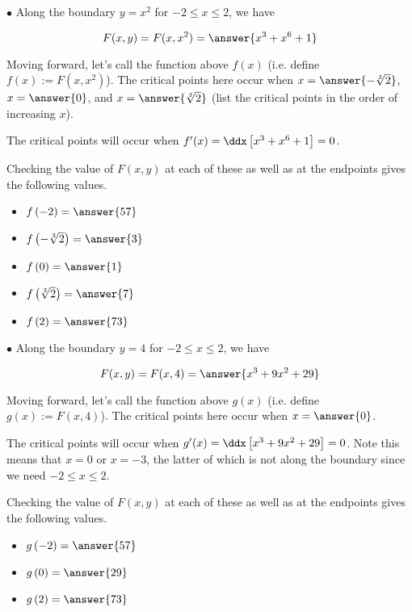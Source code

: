 \documentclass{ximera}
\begin{document}
\begin{exercise}
\begin{exercise}
\begin{exercise}
\begin{exercise}
$\bullet$ Along the boundary $y=x^2$ for $-2 \leq x \leq 2$, we have

\[
F(x,y) = F(x,x^2) = \answer{  x^3 + x^6 +1 }
\]

Moving forward, let's call the function above $f(x)$ (i.e. define $f(x) := F(x,x^2)$).  The critical points here occur when $x=\answer{-\sqrt[3]{2}}$, $x=\answer{0}$, and $x=\answer{\sqrt[3]{2}}$ (list the critical points in the order of increasing $x$).

\begin{hint}
The critical points will occur when $f'(x) = \ddx \left[  x^3 + x^6 +1 \right] =0$.
\end{hint}

\begin{exercise}
Checking the value of $F(x,y)$ at each of these as well as at the endpoints gives the following values.

\begin{itemize}
\item $f\left(-2\right) = \answer{57}$
\item $f\left(-\sqrt[3]{2}\right) = \answer{3}$
\item $f\left(0\right) = \answer{1}$
\item $f\left(\sqrt[3]{2}  \right) = \answer{7}$
\item $f\left(2 \right) = \answer{73}$
\end{itemize}

\end{exercise}

$\bullet$ Along the boundary $y=4$ for $-2 \leq x \leq 2$, we have

\[
F(x,y) = F(x,4) = \answer{  x^3+9x^2 + 29 }
\]

Moving forward,  let's call the function above $g(x)$ (i.e. define $g(x) := F(x,4)$).    The critical points here occur when $x=\answer{0}$.

\begin{hint}
The critical points will occur when $g'(x) = \ddx \left[ x^3+9x^2 + 29 \right] =0$.  Note this means that $x=0$ or $x=-3$, the latter of which is not along the boundary since we need $-2 \leq x \leq 2$.

\end{hint}

\begin{exercise}
Checking the value of $F(x,y)$ at each of these as well as at the endpoints gives the following values.

\begin{itemize}
\item $g\left(-2\right) = \answer{57}$
\item $g\left(0 \right) = \answer{29}$
\item $g\left(2 \right) = \answer{73}$
\end{itemize}



\end{exercise}
\end{exercise}
\end{exercise}
\end{exercise}
\end{exercise}
\end{document}
